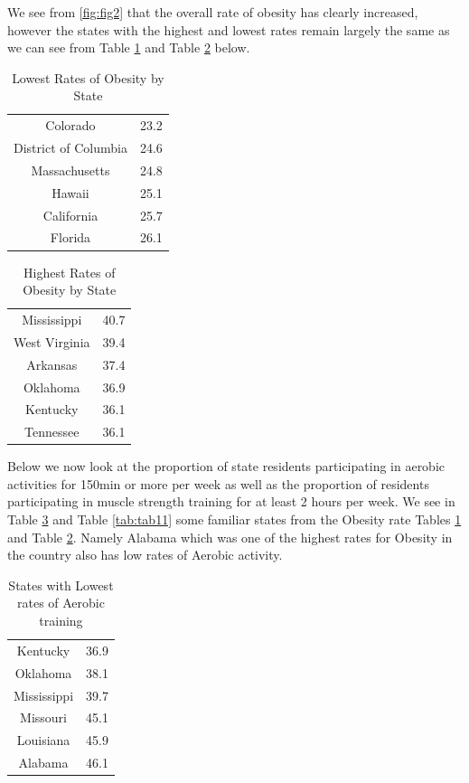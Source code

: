 \documentclass[
]{article}
\begin{document}
We see from \ref{fig:fig2} that the overall rate of obesity has clearly increased, however the states with the highest and lowest rates remain largely the same as we can see from Table \ref{tab:tab4} and Table \ref{tab:tab5} below.

\begin{table}[H]

\caption{\label{tab:tab4}Lowest Rates of Obesity by State}
\centering
\begin{tabular}[t]{cc}
\toprule
Colorado & 23.2\\
District of Columbia & 24.6\\
Massachusetts & 24.8\\
Hawaii & 25.1\\
California & 25.7\\
\addlinespace
Florida & 26.1\\
\bottomrule
\end{tabular}
\end{table}

\begin{table}[H]

\caption{\label{tab:tab5}Highest Rates of Obesity by State}
\centering
\begin{tabular}[t]{cc}
\toprule
Mississippi & 40.7\\
West Virginia & 39.4\\
Arkansas & 37.4\\
Oklahoma & 36.9\\
Kentucky & 36.1\\
\addlinespace
Tennessee & 36.1\\
\bottomrule
\end{tabular}
\end{table}

Below we now look at the proportion of state residents participating in aerobic activities for 150min or more per week as well as the proportion of residents participating in muscle strength training for at least 2 hours per week. We see in Table \ref{tab:tab10} and Table \ref{tab:tab11} some familiar states from the Obesity rate Tables \ref{tab:tab4} and Table \ref{tab:tab5}. Namely Alabama which was one of the highest rates for Obesity in the country also has low rates of Aerobic activity.

\begin{table}[H]

\caption{\label{tab:tab10}States with Lowest rates of Aerobic training}
\centering
\begin{tabular}[t]{cc}
\toprule
Kentucky & 36.9\\
Oklahoma & 38.1\\
Mississippi & 39.7\\
Missouri & 45.1\\
Louisiana & 45.9\\
\addlinespace
Alabama & 46.1\\
\bottomrule
\end{tabular}
\end{table}
\end{document}

